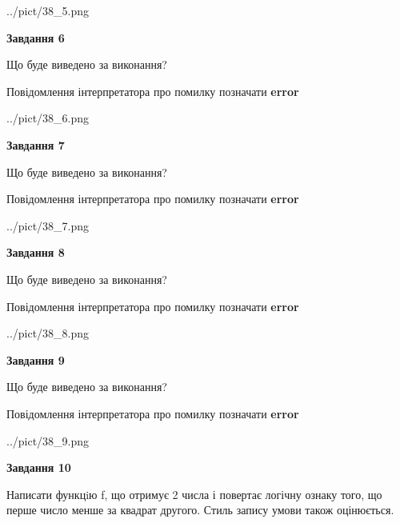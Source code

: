 \documentclass[12pt, ukrainian]{article}
\begin{document}
{\begin {large}
\begin{center}
	{../pict/38_5.png}
\end{center}
\newpage

{\begin {center}\textbf{Завдання 6}\end {center}}\par
Що буде виведено за виконання? \par
Повідомлення інтерпретатора про помилку позначати \textbf{error}

\begin{center}
	{../pict/38_6.png}
\end{center}
\newpage

{\begin {center}\textbf{Завдання 7}\end {center}}\par
Що буде виведено за виконання? \par
Повідомлення інтерпретатора про помилку позначати \textbf{error}

\begin{center}
	{../pict/38_7.png}
\end{center}
\newpage

{\begin {center}\textbf{Завдання 8}\end {center}}\par
Що буде виведено за виконання? \par
Повідомлення інтерпретатора про помилку позначати \textbf{error}

\begin{center}
	{../pict/38_8.png}
\end{center}
\newpage

{\begin {center}\textbf{Завдання 9}\end {center}}\par
Що буде виведено за виконання? \par
Повідомлення інтерпретатора про помилку позначати \textbf{error}

\begin{center}
	{../pict/38_9.png}
\end{center}
\newpage

{\begin {center}\textbf{Завдання 10}\end {center}}\par

Написати функцiю f, що отримує 2 числа і повертає логічну ознаку того, що перше число менше за квадрат другого. Стиль запису умови також оцінюється.\par
\newpage

\end {large}}
\end{document}
